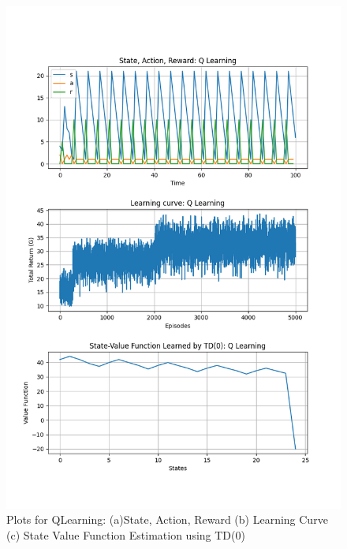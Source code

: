 \documentclass[conf]{new-aiaa}
\begin{document}
\begin{figure}[H]
\centering
\includegraphics[width=30pc]{figs/gw/qlearning_plots.png}
\caption{Plots for QLearning: (a)State, Action, Reward (b) Learning Curve (c) State Value Function Estimation using TD(0)}
\label{fig_env1}
\end{figure}
\end{document}

